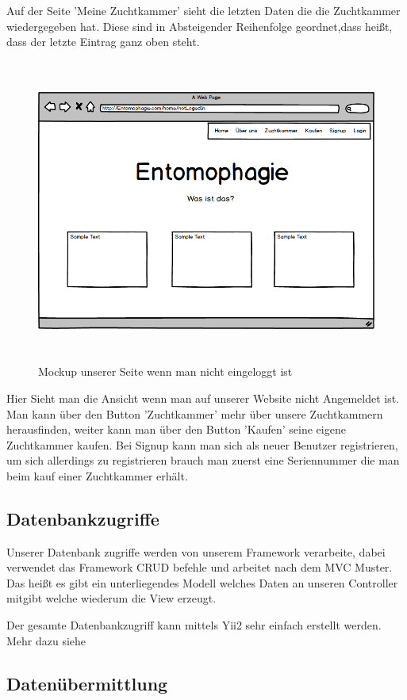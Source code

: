 Auf der Seite 'Meine Zuchtkammer' sieht die letzten Daten die die Zuchtkammer wiedergegeben hat. Diese sind in Absteigender Reihenfolge geordnet,dass heißt, dass der letzte Eintrag ganz oben steht.
\newpage
\begin{figure}
\includegraphics[height=10cm]{figures/NotlogedIN}
\caption{Mockup unserer Seite wenn man nicht eingeloggt ist}
\end{figure}
Hier Sieht man die Ansicht wenn man auf unserer Website nicht Angemeldet ist. Man kann über den Button 'Zuchtkammer' mehr über unsere Zuchtkammern herausfinden, weiter kann man über den Button 'Kaufen' seine eigene Zuchtkammer kaufen. Bei Signup kann man sich als neuer Benutzer registrieren, um sich allerdings zu registrieren brauch man zuerst eine Seriennummer die man beim kauf einer Zuchtkammer erhält.
\newpage

\subsection{Datenbankzugriffe}
Unserer Datenbank zugriffe werden von unserem Framework verarbeite, dabei verwendet das Framework CRUD befehle und arbeitet nach dem MVC Muster. Das heißt es gibt ein unterliegendes Modell welches Daten an unseren Controller mitgibt welche wiederum die View erzeugt.

Der gesamte Datenbankzugriff kann mittels Yii2 sehr einfach erstellt werden. Mehr dazu siehe 

\subsection{Datenübermittlung} \label{sec:daten}

